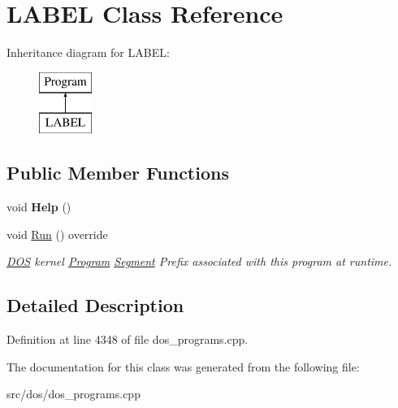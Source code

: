 \hypertarget{classLABEL}{\section{L\-A\-B\-E\-L Class Reference}
\label{classLABEL}
}
Inheritance diagram for L\-A\-B\-E\-L\-:\begin{figure}[H]
\begin{center}
\leavevmode
\includegraphics[height=2.000000cm]{classLABEL}
\end{center}
\end{figure}
\subsection*{Public Member Functions}
\begin{DoxyCompactItemize}
\item 
\hypertarget{classLABEL_ad6b2eb925e023fcbac597f6cf00d447f}{void {\bfseries Help} ()}\label{classLABEL_ad6b2eb925e023fcbac597f6cf00d447f}

\item 
\hypertarget{classLABEL_ac6fdf7e1b56f01f8e98cd7db4084f46c}{void \hyperlink{classLABEL_ac6fdf7e1b56f01f8e98cd7db4084f46c}{Run} () override}\label{classLABEL_ac6fdf7e1b56f01f8e98cd7db4084f46c}

\begin{DoxyCompactList}\small\item\em \hyperlink{classDOS}{D\-O\-S} kernel \hyperlink{classProgram}{Program} \hyperlink{structSegment}{Segment} Prefix associated with this program at runtime. \end{DoxyCompactList}\end{DoxyCompactItemize}


\subsection{Detailed Description}


Definition at line 4348 of file dos\-\_\-programs.\-cpp.



The documentation for this class was generated from the following file\-:\begin{DoxyCompactItemize}
\item 
src/dos/dos\-\_\-programs.\-cpp\end{DoxyCompactItemize}
